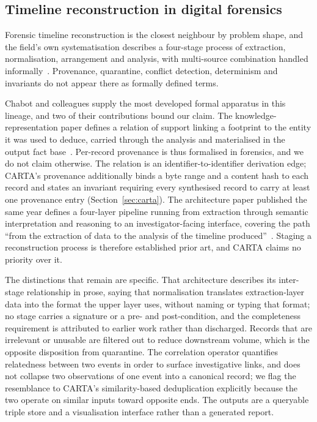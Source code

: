 \subsection{Timeline reconstruction in digital forensics}
\label{sec:related:forensics}

Forensic timeline reconstruction is the closest neighbour by problem shape, and the
field's own systematisation describes a four-stage process of extraction,
normalisation, arrangement and analysis, with multi-source combination handled
informally~\citep{breitinger2025sok}. Provenance, quarantine, conflict detection,
determinism and invariants do not appear there as formally defined terms.

Chabot and colleagues supply the most developed formal apparatus in this lineage,
and two of their contributions bound our claim. The knowledge-representation paper
defines a relation of support linking a footprint to the entity it was used to
deduce, carried through the analysis and materialised in the output fact
base~\citep{chabot2014knowledge}. Per-record provenance is thus formalised in
forensics, and we do not claim otherwise. The relation is an
identifier-to-identifier derivation edge; CARTA's provenance additionally binds a
byte range and a content hash to each record and states an invariant requiring
every synthesised record to carry at least one provenance entry
(Section~\ref{sec:carta}). The architecture paper published the same year defines a
four-layer pipeline running from extraction through semantic interpretation and
reasoning to an investigator-facing interface, covering the path ``from the
extraction of data to the analysis of the timeline
produced''~\citep{chabot2014timeline}. Staging a reconstruction process is
therefore established prior art, and CARTA claims no priority over it.

The distinctions that remain are specific. That architecture describes its
inter-stage relationship in prose, saying that normalisation translates
extraction-layer data into the format the upper layer uses, without naming or
typing that format; no stage carries a signature or a pre- and post-condition, and
the completeness requirement is attributed to earlier work rather than discharged.
Records that are irrelevant or unusable are filtered out to reduce downstream
volume, which is the opposite disposition from quarantine. The correlation operator
quantifies relatedness between two events in order to surface investigative links,
and does not collapse two observations of one event into a canonical record; we
flag the resemblance to CARTA's similarity-based deduplication explicitly because
the two operate on similar inputs toward opposite ends. The outputs are a queryable
triple store and a visualisation interface rather than a generated report.

